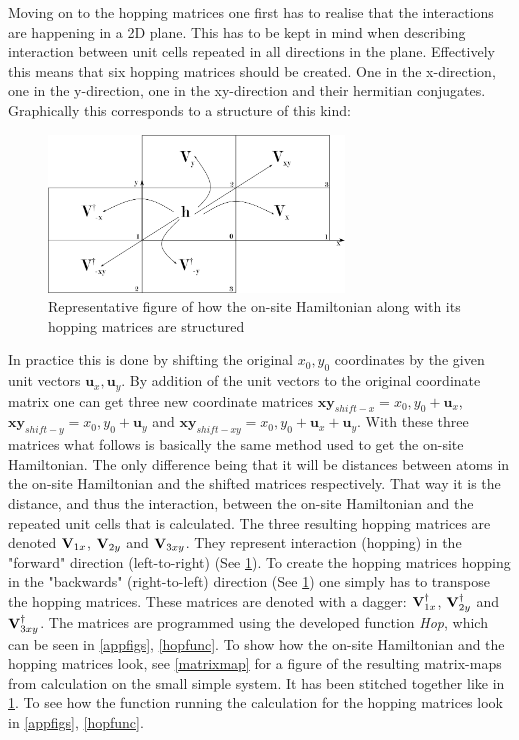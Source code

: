 Moving on to the hopping matrices one first has to realise that the interactions are happening in a 2D plane. This has to be kept in mind when describing interaction between unit cells repeated in all directions in the plane. Effectively this means that six hopping matrices should be created. One in the x-direction, one in the y-direction, one in the xy-direction and their hermitian conjugates. Graphically this corresponds to a structure of this kind:
\begin{figure}[H]
	\centering
	\includegraphics[width = 0.7\textwidth]{Figures/repfig.eps}
	\caption{Representative figure of how the on-site Hamiltonian along with its hopping matrices are structured}
	\label{repfig}
\end{figure}
In practice this is done by shifting the original \(x_0,y_0\) coordinates by the given unit vectors \(\mathbf{u}_x,\mathbf{u}_y\). By addition of the unit vectors to the original coordinate matrix one can get three new coordinate matrices \(\mathbf{xy}_{shift-x}=x_0,y_0 + \mathbf{u}_x\), \(\mathbf{xy}_{shift-y}=x_0,y_0 + \mathbf{u}_y\) and \(\mathbf{xy}_{shift-xy}=x_0,y_0 + \mathbf{u}_x+\mathbf{u}_y\). With these three matrices what follows is basically the same method used to get the on-site Hamiltonian. The only difference being that it will be distances between atoms in the on-site Hamiltonian and the shifted matrices respectively. That way it is the distance, and thus the interaction, between the on-site Hamiltonian and the repeated unit cells that is calculated. The three resulting hopping matrices are denoted \(\vb{V}_{1x}\), \(\vb{V}_{2y}\) and \(\vb{V}_{3xy}\). They represent interaction (hopping) in the "forward" direction (left-to-right) (See \cref{repfig}). To create the hopping matrices hopping in the "backwards" (right-to-left) direction (See \cref{repfig}) one simply has to transpose the hopping matrices. These matrices are denoted with a dagger: \(\vb{V}_{1x}^{\dagger}\), \(\vb{V}_{2y}^{\dagger}\) and \(\vb{V}_{3xy}^{\dagger}\). The matrices are programmed using the developed function \textit{Hop}, which can be seen in \cref{appfigs}, \cref{hopfunc}. To show how the on-site Hamiltonian and the hopping matrices look, see \cref{matrixmap} for a figure of the resulting matrix-maps from calculation on the small simple system. It has been stitched together like in \cref{repfig}. To see how the function running the calculation for the hopping matrices look in \cref{appfigs}, \cref{hopfunc}. 
